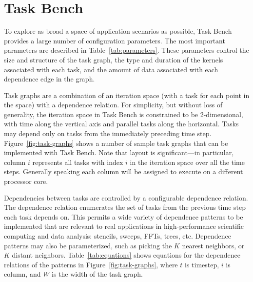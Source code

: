 \section{Task Bench}
\label{sec:task-bench}



To explore as broad a space of application scenarios as possible, Task
Bench provides a large number of configuration parameters. The most
important parameters are described in
Table~\ref{tab:parameters}. These parameters control the size and
structure of the task graph, the type and duration of the kernels
associated with each task, and the amount of data associated with
each dependence edge in the graph.

Task graphs are a combination of an iteration space (with a task for
each point in the space) with a dependence relation.
For simplicity, but without loss of generality, the iteration space in
Task Bench is constrained to be 2-dimensional, with time along
the vertical axis and parallel tasks along the
horizontal. Tasks may depend only on tasks from the immediately
preceding time step. Figure~\ref{fig:task-graphs} shows a number of sample task
graphs that can be implemented with Task Bench. Note that layout is
significant---in particular, column $i$ represents all tasks
with index $i$ in the iteration space over all the time
steps. Generally speaking each column will be
assigned to execute on a different processor core.

Dependencies between tasks are controlled by a configurable dependence
relation. The
dependence relation enumerates the set of tasks from the
previous time step each task depends on. This permits a wide variety
of dependence patterns to be implemented that are relevant to real
applications in high-performance scientific computing and data analysis: stencils,
sweeps, FFTs, trees, etc. Dependence patterns may also be
parameterized, such as picking the $K$ nearest neighbors, or $K$
distant neighbors. Table~\ref{tab:equations} shows equations for the
dependence relations of the patterns in Figure~\ref{fig:task-graphs},
where $t$ is timestep, $i$ is column, and $W$ is the width of the task
graph.




